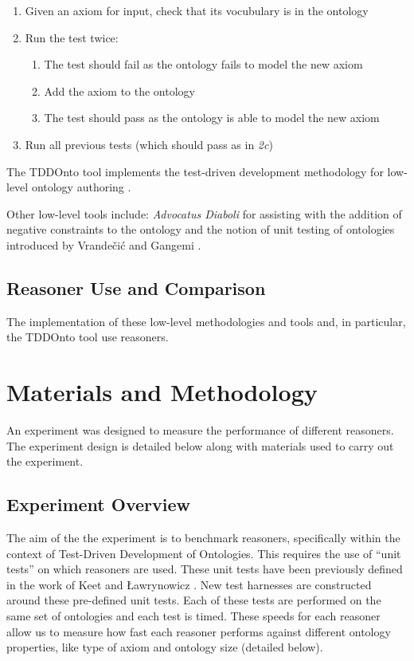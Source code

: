 \documentclass[draft]{sig-alternate-05-2015}
\newcommand{\todo}[1][]{\ifdraft{\ifthenelse{\isempty{#1}}{\hl{(TODO)}}{\hl{(TODO: #1)}}}{}}
\begin{document}
\begin{enumerate}
	\item Given an axiom for input, check that its vocubulary is in the ontology
	\item Run the test twice:
	\begin{enumerate}
		\item The test should fail as the ontology fails to model the new axiom
		\item Add the axiom to the ontology
		\item The test should pass as the ontology is able to model the new axiom
	\end{enumerate}
	\item Run all previous tests (which should pass as in \textit{2c})
\end{enumerate}

The TDDOnto tool implements the test-driven development methodology for low-level ontology authoring \cite{DBLP:conf/dlog/LawrynowiczK16}.

Other low-level tools include: \textit{Advocatus Diaboli} for assisting with the addition of negative constraints to the ontology \cite{DBLP:conf/ekaw/FerreR12} and the notion of unit testing of ontologies introduced by Vrande\v{c}i\'c and Gangemi \cite{DBLP:conf/otm/VrandecicG06}. 

\subsection{Reasoner Use and Comparison}

The implementation of these low-level methodologies and tools and, in particular, the TDDOnto tool \cite{DBLP:conf/dlog/LawrynowiczK16} use reasoners.

\todo

\section{Materials and Methodology}

An experiment was designed to measure the performance of different reasoners. The experiment design is detailed below along with materials used to carry out the experiment.

\subsection{Experiment Overview}
The aim of the the experiment is to benchmark reasoners, specifically within the context of Test-Driven Development of Ontologies. This requires the use of ``unit tests'' on which reasoners are used. These unit tests have been previously defined in the work of Keet and \L{}awrynowicz \cite{DBLP:conf/esws/KeetL16}. New test harnesses are constructed around these pre-defined unit tests. Each of these tests are performed on the same set of ontologies and each test is timed. These speeds for each reasoner allow us to measure how fast each reasoner performs against different ontology properties, like type of axiom and ontology size (detailed below).
\end{document}
